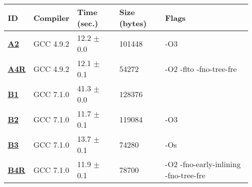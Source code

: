     \begin{tabular}{|l|l|l|l|p{3.2in}|}
     \hline
      \textbf{ID} & \textbf{Compiler} & \textbf{Time (sec.)} & \textbf{Size (bytes)} & \textbf{Flags} \\ 
     \hline
      \textbf{ \href{http://cknowledge.org/repo/web.php?wcid=experiment:9b2b24a80c45aa9b\&subpoint=eb28149e9a71762d}{A2} } &  GCC 4.9.2  &  12.2 $\pm$ 0.0  &  101448  & {\small -O3 }\\
     \hline
      \textbf{ \href{http://cknowledge.org/repo/web.php?wcid=experiment:f5489592a3a15bf3\&subpoint=6236b2e4742629aa}{A4R} } &  GCC 4.9.2  &  12.1 $\pm$ 0.1  &  54272  & {\small -O2 -flto -fno-tree-fre }\\
     \hline
      \textbf{ \href{http://cknowledge.org/repo/web.php?wcid=experiment:1d1b423cb2567413\&subpoint=f42caae168d92907}{B1} } &  GCC 7.1.0  &  41.3 $\pm$ 0.0  &  128376  & {\small  }\\
     \hline
      \textbf{ \href{http://cknowledge.org/repo/web.php?wcid=experiment:45b844dc97bc88bb\&subpoint=c88f2a728405d8eb}{B2} } &  GCC 7.1.0  &  11.7 $\pm$ 0.1  &  119084  & {\small -O3 }\\
     \hline
      \textbf{ \href{http://cknowledge.org/repo/web.php?wcid=experiment:a1e26d8e4858adf5\&subpoint=bbf4d22b4e9b34d5}{B3} } &  GCC 7.1.0  &  13.7 $\pm$ 0.1  &  74280  & {\small -Os }\\
     \hline
      \textbf{ \href{http://cknowledge.org/repo/web.php?wcid=experiment:b642fbace509ae5a\&subpoint=cd944d398d208b53}{B4R} } &  GCC 7.1.0  &  11.9 $\pm$ 0.1  &  78700  & {\small -O2 -fno-early-inlining -fno-tree-fre }\\
     \hline
    \end{tabular}    